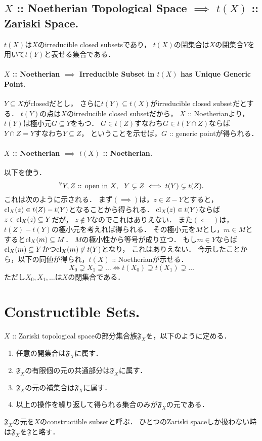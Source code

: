 \documentclass[a4paper]{jsarticle}
\newcommand{\ClosedIn}{\text{ :: open in }}
\begin{document}
    \subsection{$X$ :: Noetherian Topological Space $\implies$ $t(X)$ :: Zariski Space.}
    $t(X)$は$X$のirreducible closed subsetsであり，
    $t(X)$の閉集合は$X$の閉集合$Y$を用いて$t(Y)$と表せる集合である．

    \paragraph{$X$ :: Noetherian $\implies$ Irreducible Subset in $t(X)$ has Unique Generic Point.}
    $Y \subseteq X$がclosedだとし，
    さらに$t(Y) \subseteq t(X)$がirreducible closed subsetだとする．
    $t(Y)$の点は$X$のirreducible closed subsetだから，
    $X$ :: Noetherianより，$t(Y)$は極小元$G \subseteq Y$をもつ．
    $G \in t(Z)$すなわち$G \in t(Y \cap Z)$ならば$Y \cap Z=Y$すなわち$Y \subseteq Z$，
    ということを示せば，$G$ :: generic pointが得られる．

    \paragraph{$X$ :: Noetherian $\implies$ $t(X)$ :: Noetherian.}
    以下を使う．
    \[ \Forall{Y,Z \ClosedIn X} Y \subsetneq Z \iff t(Y) \subsetneq t(Z). \]
    これは次のように示される．
    まず$(\implies)$は，$z \in Z-Y$とすると，$\operatorname{cl}_X(z) \in t(Z)-t(Y)$となることから得られる．
    $\operatorname{cl}_X(z) \in t(Y)$ならば$z \in \operatorname{cl}_X(z) \subseteq Y$だが，
    $z \not \in Y$なのでこれはありえない．
    また$(\impliedby)$は，$t(Z)-t(Y)$の極小元を考えれば得られる．
    その極小元を$M$とし，$m \in M$とすると$\operatorname{cl}_X(m) \subseteq M$．
    $M$の極小性から等号が成り立つ．
    もし$m \in Y$ならば$\operatorname{cl}_X(m) \subseteq Y$かつ$\operatorname{cl}_X(m) \not \in t(Y)$となり，
    これはありえない．
    今示したことから，以下の同値が得られ，$t(X)$ :: Noetherianが示せる．
    \[ X_0 \supsetneq X_1 \supsetneq \dots \iff t(X_0) \supsetneq t(X_1) \supsetneq \dots \]
    ただし$X_0,X_1,\dots$は$X$の閉集合である．

\section{Constructible Sets.} %
    $X$ :: Zariski topological spaceの部分集合族$\mathfrak{F}_X$を，以下のように定める．
    \begin{enumerate}[label=(\arabic*),leftmargin=5\parindent]
        \item 任意の開集合は$\mathfrak{F}_X$に属す．
        \item $\mathfrak{F}_X$の有限個の元の共通部分は$\mathfrak{F}_X$に属す．
        \item $\mathfrak{F}_X$の元の補集合は$\mathfrak{F}_X$に属す．
        \item 以上の操作を繰り返して得られる集合のみが$\mathfrak{F}_X$の元である．
    \end{enumerate}
    $\mathfrak{F}_X$の元を$X$のconstructible subsetと呼ぶ．
    ひとつのZariski spaceしか扱わない時は$\mathfrak{F}_X$を$\mathfrak{F}$と略す．
\end{document}

